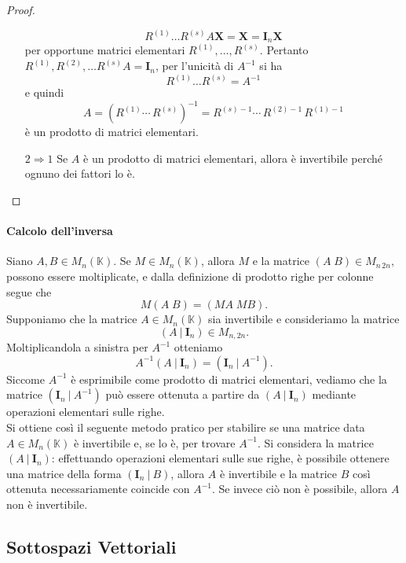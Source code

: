 \documentclass{article}
\theoremstyle{plain}
\theoremstyle{definition}
\theoremstyle{remark}
\begin{document}
\begin{proof}
\begin{itemize}
        \[
            R^{(1)} \ldots R^{(s)}A\mathbf{X} = \mathbf{X} = \mathbf{I}_n\mathbf{X}
        \]
        per opportune matrici elementari \( R^{(1)}, \ldots, R^{(s)} \).        
        Pertanto \( R^{(1)}, R^{(2)}, \ldots R^{(s)}A = \mathbf{I}_n \), per l'unicità di \( A^{-1} \) si ha 
        \[ R^{(1)} \ldots R^{(s)} = A^{-1} \] e quindi
        \[
            A = (R^{(1)} \cdots\, R^{(s)})^{-1} = R^{(s)-1} \cdots\, R^{(2)-1}\, R^{(1)-1}
        \]
        è un prodotto di matrici elementari.
        \item[$2\Rightarrow 1$]
        Se \( A \) è un prodotto di matrici elementari, allora è invertibile perché ognuno dei fattori lo è.
    \end{itemize}
\end{proof}

\vspace{10pt}

\paragraph{Calcolo dell'inversa}
Siano \( A, B \in M_n(\mathbb{K}) \). Se \( M \in M_n(\mathbb{K}) \), allora \( M \) e la matrice \( (A \; B) \in M_{n\,2n}, \) possono essere moltiplicate, e dalla definizione di prodotto righe per colonne segue che
\[
    M(A \; B) = (MA \; MB).
\]
Supponiamo che la matrice \( A \in M_n(\mathbb{K}) \) sia invertibile e consideriamo la matrice \[ (A \ | \ \mathbf{I}_n) \in M_{n, 2n}. \]
Moltiplicandola a sinistra per \( A^{-1} \) otteniamo
\[
A^{-1}(A \ | \ \mathbf{I}_n) = (\mathbf{I}_n \ | \ A^{-1}).
\]
Siccome \( A^{-1} \) è esprimibile come prodotto di matrici elementari, vediamo che la matrice \( (\mathbf{I}_n \ | \ A^{-1}) \) può essere ottenuta a partire da \( (A \ | \ \mathbf{I}_n) \) mediante operazioni elementari sulle righe.\\
Si ottiene così il seguente metodo pratico per stabilire se una matrice data \( A \in M_n(\mathbb{K}) \) è invertibile e, se lo è, per trovare \( A^{-1} \). 
Si considera la matrice \( (A \ | \ \mathbf{I}_n) \): effettuando operazioni elementari sulle sue righe, è possibile ottenere una matrice della forma \( (\mathbf{I}_n \ |\  B) \), allora \( A \) è invertibile e la matrice \( B \) così ottenuta necessariamente coincide con \( A^{-1} \). 
Se invece ciò non è possibile, allora \( A \) non è invertibile.

\vspace{50pt}
\subsection{Sottospazi Vettoriali}
\vspace{20pt}
\end{document}
